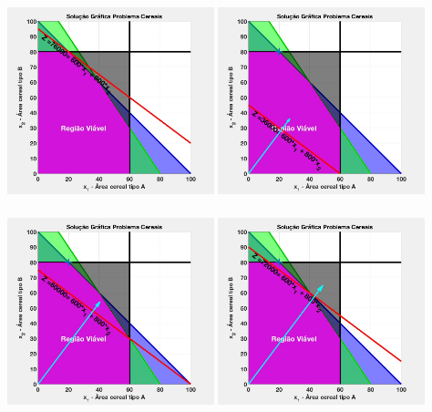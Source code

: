 \documentclass{beamer}
\begin{document}
\begin{frame}
\begin{columns}
\begin{column}{0.5\textwidth}
		\end{column}
		\begin{column}{0.5\textwidth}
			\centering
			\only<1-3> {\includegraphics[width=6cm,height=6cm]{MatLab/anima_18.png} }
			\only<4-6> {\includegraphics[width=6cm,height=6cm]{MatLab/anima_19.png} }
			\only<7> {\includegraphics[width=6cm,height=6cm]{MatLab/anima_20.png} }
			\only<8> {\includegraphics[width=6cm,height=6cm]{MatLab/anima_21.png} }

\end{column}
\end{columns}
\end{frame}
\end{document}
